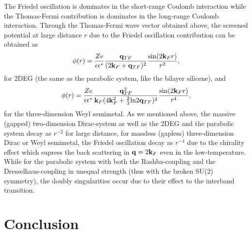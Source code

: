\documentclass[UTF8,a4paper]{article}
\begin{document}
\begin{large}
The Friedel oscillation is dominates in the short-range Coulomb interaction while the Thomas-Fermi contribution is
dominates in the long-range Coulomb interaction\cite{Thakur A2}.
Through the Thomas-Fermi wave vector obtained above,
the screened potential at large distance $r$ due to the Friedel oscillation contribution can be obtained as
\begin{equation} 
\begin{aligned}
\phi(r)=\frac{Ze}{\epsilon\epsilon^{*}}\frac{{\bf q}_{TF}}{(2{\bf k}_{F}+{\bf q}_{TF})^{2}}\frac{{\rm sin}(2{\bf k}_{F}r)}{r^{2}},
\end{aligned}
\end{equation}
for 2DEG (the same as the parabolic system, like the bilayer silicene), and\cite{Lv M}
\begin{equation} 
\begin{aligned}
\phi(r)=\frac{Ze}{\epsilon\epsilon^{*}}\frac{{\bf q}_{TF}^{2}}
{{\bf k}_{F}(4{\bf k}^{2}_{F}+\frac{2}{3}{\rm ln}2{\bf q}_{TF})^{2}}\frac{{\rm sin}(2{\bf k}_{F}r)}{r^{4}},
\end{aligned}
\end{equation}
for the three-dimension Weyl semimetal.
As we mentioned above, the massive (gapped) two-dimension Dirac-system as well as the 2DEG and the parabolic system
decay as $r^{-2}$ for large distance,
for massless (gapless) three-dimension Dirac or Weyl semimetal, the Friedel oscillation decay as $r^{-4}$
due to the chirality effect which supress the back scattering in ${\bf q}=2{\bf k}_{F}$ even in the low-temperature.
While for the parabolic system with both the Rashba-coupling and the Dresselhaus-coupling in unequal strength
(thus with the broken SU(2) symmetry),
the doubly singularities occur\cite{Badalyan S M} due to their effect to the interband transition\cite{Li Z}.



\section{Conclusion}


\end{large}
\end{document}
